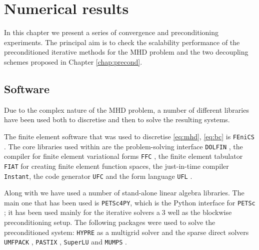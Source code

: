 \chapter{Numerical results}
\label{chap:results}
In this chapter we present a series of convergence and preconditioning experiments. The principal aim is to check the scalability performance of the preconditioned iterative methods for the MHD problem and the two decoupling schemes proposed in Chapter \ref{chap:precond}. 

\section{Software}

Due to the complex nature of the MHD problem, a number of different libraries have been used both to discretise and then to solve the resulting systems.

The finite element software that was used to discretise \eqref{eq:mhd}, \eqref{eq:bc} is {\tt FEniCS} \cite{wells2012automated}. The core libraries used within \fenics are the problem-solving interface {\tt DOLFIN} \cite{LoggWells2010a,LoggWellsEtAl2012a},  the compiler for finite element variational forms {\tt FFC} \cite{KirbyLogg2006a,LoggOlgaardEtAl2012a,OlgaardWells2010b}, the finite element  tabulator {\tt FIAT} \cite{Kirby2012a,Kirby2004a} for creating finite element function spaces, the just-in-time compiler {\tt Instant},  the code generator {\tt UFC} \cite{AlnaesLoggEtAl2009a,AlnaesLoggEtAl2012a} and  the form language {\tt UFL} \cite{AlnaesEtAl2012,Alnaes2012a}.

Along with \fenics we have used a number of stand-alone linear algebra libraries. The main one that has been used is {\tt PETSc4PY}, which is the Python interface for {\tt PETSc} \cite{petsc-web-page,petsc-user-ref}; it has been used mainly for the iterative solvers a^^^^^s well as the blockwise preconditioning setup. The following packages were used to solve the preconditioned system: {\tt HYPRE} \cite{falgout2002hypre} as a multigrid solver and the sparse direct solvers  {\tt UMFPACK} \cite{Davis:2004:CPS:992200.992205,Davis:2004:AUV:992200.992206,Davis:1999:CUM:305658.287640,davis1997unsymmetric}, {\tt PASTIX} \cite{henon2002pastix}, {\tt SuperLU} \cite{superlu_ug99,li05} and {\tt MUMPS} \cite{amestoy2000multifrontal,amestoy2001fully,amestoy2006hybrid}.


